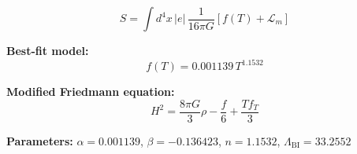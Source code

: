 
\begin{equation}
  S = \int d^4x \, |e| \, \frac{1}{16\pi G} \left[ f(T) + \mathcal{L}_m \right]
\end{equation}

\textbf{Best-fit model:}
\begin{equation}
  f(T) = 0.001139 \, T^{1.1532}
\end{equation}

\textbf{Modified Friedmann equation:}
\begin{equation}
  H^2 = \frac{8\pi G}{3} \rho - \frac{f}{6} + \frac{T f_T}{3}
\end{equation}

\textbf{Parameters:}
$\alpha = 0.001139$, \quad
$\beta = -0.136423$, \quad
$n = 1.1532$, \quad
$\Lambda_{\text{BI}} = 33.2552$